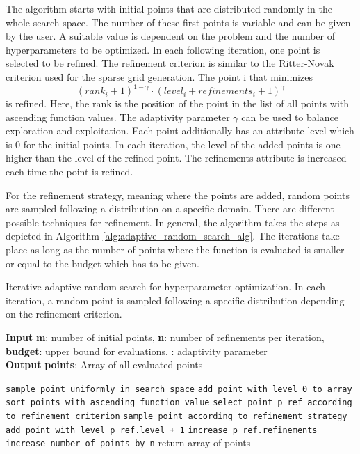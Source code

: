 The algorithm starts with initial points that are distributed randomly in the whole search space. The number of these first points is variable and can be given by the user. A suitable value is dependent on the problem and the number of hyperparameters to be optimized. In each following iteration, one point is selected to be refined. The refinement criterion is similar to the Ritter-Novak criterion used for the sparse grid generation. The point i that minimizes 
\begin{equation}
\label{eq:refinement_criterion}
	(rank_i + 1)^{1-\gamma} \cdot (level_i + refinements_i + 1)^\gamma
\end{equation} 
is refined. Here, the rank is the position of the point in the list of all points with ascending function values. The adaptivity parameter $ \gamma $ can be used to balance exploration and exploitation. Each point additionally has an attribute level which is 0 for the initial points. In each iteration, the level of the added points is one higher than the level of the refined point. The refinements attribute is increased each time the point is refined. \newline

For the refinement strategy, meaning where the points are added, random points are sampled following a distribution on a specific domain. There are different possible techniques for refinement. In general, the algorithm takes the steps as depicted in Algorithm \ref{alg:adaptive_random_search_alg}. The iterations take place as long as the number of points where the function is evaluated is smaller or equal to the budget which has to be given.

\begin{algorithm}[H]
	\caption{ Iterative adaptive random search for hyperparameter optimization. In each iteration, a random point is sampled following a specific distribution depending on the refinement criterion. }
	\label{alg:adaptive_random_search_alg}
	\textbf{Input} \textbf{m}: number of initial points, \textbf{n}: number of refinements per iteration, \textbf{budget}: upper bound for evaluations, \boldmath{ $ \gamma $}: adaptivity parameter\\
	\textbf{Output} \textbf{points}: Array of all evaluated points
	\begin{algorithmic}
			\State \texttt{sample point uniformly in search space}
			\State \texttt{add point with level 0 to array}
		\EndFor
			\State \texttt{sort points with ascending function value}
			\State \texttt{select point p\_ref according to refinement criterion}
				\State \texttt{sample point according to refinement strategy}
				\State \texttt{add point with level p\_ref.level + 1}
				\State \texttt{increase p\_ref.refinements}
			\EndFor
			\State \texttt{increase number of points by n}
		\EndWhile
		\State return array of points
	\end{algorithmic}
\end{algorithm}

